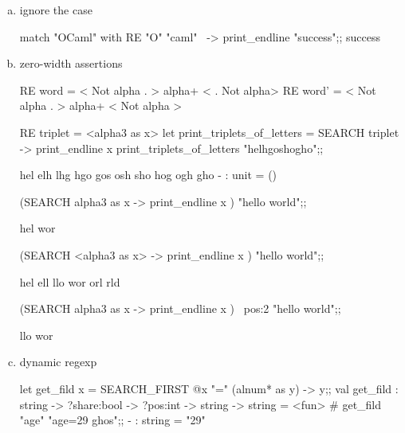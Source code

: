 \begin{enumerate}
\begin{enumerate}[(a)]
\item ignore the case
  \begin{alternate}
match "OCaml" with RE "O" "caml"~ -> print_endline "success";;
success    
\end{alternate}


\item zero-width assertions

  \begin{ocamlcode}
RE word =  < Not alpha . >    alpha+ < . Not alpha>
RE word' = < Not alpha . >    alpha+ < Not alpha >
\end{ocamlcode}

\begin{ocamlcode}
RE triplet = <alpha{3} as x>
let print_triplets_of_letters = SEARCH triplet -> print_endline x
print_triplets_of_letters "helhgoshogho";;
\end{ocamlcode}
\begin{ocamlcode}
hel
elh
lhg
hgo
gos
osh
sho
hog
ogh
gho
- : unit = ()
\end{ocamlcode}
\begin{ocamlcode}
(SEARCH alpha{3} as x -> print_endline x ) "hello world";;
\end{ocamlcode}

\begin{ocamlcode}
hel
wor
\end{ocamlcode}
\begin{ocamlcode}
(SEARCH <alpha{3} as x> -> print_endline x ) "hello world";;
\end{ocamlcode}
\begin{ocamlcode}
hel
ell
llo
wor
orl
rld
\end{ocamlcode}
\begin{ocamlcode}
(SEARCH alpha{3} as x -> print_endline x ) ~pos:2 "hello world";;
\end{ocamlcode}
\begin{ocamlcode}
llo
wor
\end{ocamlcode}





\item dynamic regexp 

  \begin{alternate}
let get_fild x = SEARCH_FIRST @x "=" (alnum* as y) -> y;;
val get_fild : string -> ?share:bool -> ?pos:int -> string -> string = <fun>
# get_fild "age" "age=29 ghos";;
- : string = "29"    
\end{alternate}




\end{enumerate}
\end{enumerate}
